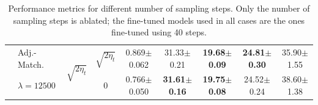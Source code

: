 \begin{table}[h!]
{\begin{tabular}{llccccccc}
    \addlinespace
     & Adj.-Match.  & \multirow{2}{*}{$\sqrt{2 \eta_t}$} & $\sqrt{2 \eta_t}$ & 0.869{\tiny$\pm$0.062} & 31.33{\tiny$\pm$0.21} & \textbf{19.68{\tiny$\pm$0.09}} & \textbf{24.81{\tiny$\pm$0.30}} & 35.90{\tiny$\pm$1.55} \\
     & $\lambda = 12500$                     &                                    & 0                 & 0.766{\tiny$\pm$0.050} & \textbf{31.61{\tiny$\pm$0.16}} & \textbf{19.75{\tiny$\pm$0.08}} & 24.52{\tiny$\pm$0.24} & 38.60{\tiny$\pm$1.38} \\
    \bottomrule
\end{tabular}
}
\caption{Performance metrics for different number of sampling steps. Only the number of sampling steps is ablated; the fine-tuned models used in all cases are the ones fine-tuned using 40 steps.
}
\label{table:metrics_multiprompt_sampling_steps}
\end{table}

